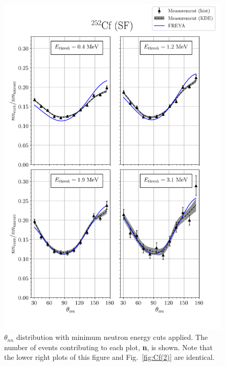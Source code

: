 \begin{figure}
\centering
    \includegraphics[width = \figsize\textwidth]{FinalCf252Resultw_freya0KDE.png}
    \caption{
    $\theta_{nn}$ distribution with minimum neutron energy cuts applied.
    The number of events contributing to each plot, \textbf{n}, is shown.  Note that the lower right plots of this figure and Fig.~\ref{fig:Cf(2)} are identical.}
    \label{fig:Cf(0)}
\end{figure}
